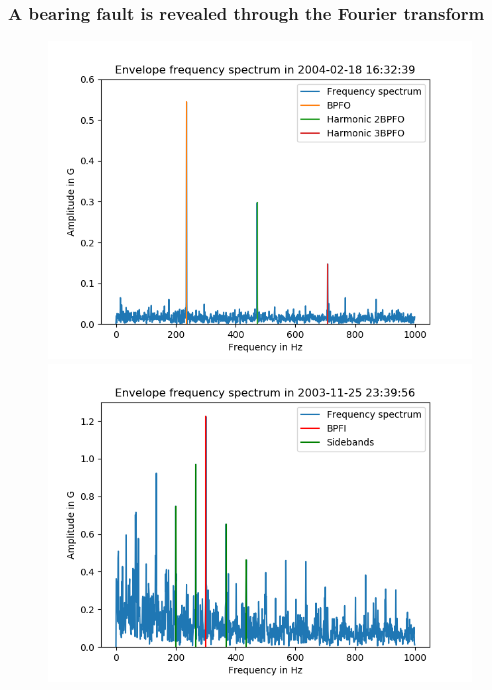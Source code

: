 \documentclass{beamer}
\begin{document}
\begin{frame}
	\frametitle{A bearing fault is revealed through the Fourier transform}
	\begin{figure}[H]
		\centering
		\includegraphics[width=0.45\linewidth]{last_day_spectrum_bpfo}
		\includegraphics[width=0.45\linewidth]{bpfi_sidebands}
	\end{figure}
\end{frame}

\end{document}
